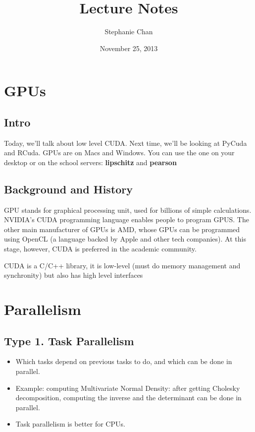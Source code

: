 \documentclass[11pt]{article}
\title{Lecture Notes}
\author{Stephanie Chan}
\date{November 25, 2013}
\begin{document}
\maketitle

\section{GPUs}
\label{sec-1}
\subsection{Intro}
\label{sec-1-1}

Today, we'll talk about low level CUDA.  Next time, we'll be looking
at PyCuda and RCuda.  GPUs are on Macs and Windows.  You can use the
one on your desktop or on the school servers: \textbf{lipschitz} and \textbf{pearson}
\subsection{Background and History}
\label{sec-1-2}

GPU stands for graphical processing unit, used for billions of
simple calculations. NVIDIA's CUDA programming language 
enables people to program GPUS.  The other main manufacturer of GPUs
is AMD, whose GPUs can be programmed using OpenCL (a language backed
by Apple and other tech companies).  At this stage, however, CUDA is
preferred in the academic community.

CUDA is a C/C++ library, it is low-level (must do memory management
and synchronity) but also has high level interfaces
\section{Parallelism}
\label{sec-2}
\subsection{Type 1. Task Parallelism}
\label{sec-2-1}

\begin{itemize}
\item Which tasks depend on previous tasks to do, and which can be done in
  parallel.
\item Example: computing Multivariate Normal Density: after getting
  Cholesky decomposition, computing the inverse and the determinant
  can be done in parallel.
\item Task parallelism is better for CPUs.
\end{itemize}
\end{document}
